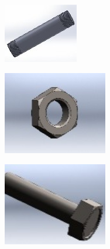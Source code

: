 \documentclass[../../main]{subfiles}
\begin{document}
\begin{figure}[h]
\begin{subfigure}[b]{0.30\textwidth}
  \caption[short]{}
  \label{b}
\end{subfigure}
\hfill
\begin{subfigure}[b]{0.30\textwidth}
  \centering
  \includegraphics[width=\textwidth]{img/image097.jpg}
  \caption[short]{}
  \label{c}
\end{subfigure}
\begin{subfigure}[b]{0.495\textwidth}
  \centering
  \includegraphics[width=0.5\textwidth]{img/image099.jpg}
  \caption[short]{}
  \label{d}
\end{subfigure}
\hfill
\begin{subfigure}[b]{0.495\textwidth}
  \centering
  \includegraphics[width=0.5\textwidth]{img/image101.jpg}

\end{subfigure}
\end{figure}
\end{document}
